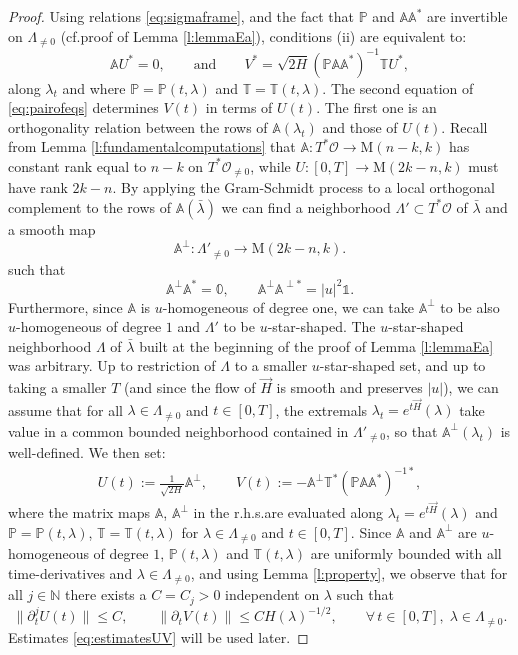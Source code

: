 \documentclass[10pt,a4paper]{amsart}
\newcommand{\A}{\mathbb{A}}
\newcommand{\N}{\mathbb{N}} %
\renewcommand{\P}{\mathbb{P}}
\begin{document}
\begin{proof}
Using relations \eqref{eq:sigmaframe}, and the fact that $\P$ and $\A\A^*$ are invertible on $\Lambda_{\neq 0}$ (cf.\@ proof of Lemma \ref{l:lemmaEa}), conditions (ii) are equivalent to:
\begin{equation}\label{eq:pairofeqs}
\A U^* = 0, \qquad \text{and}\qquad V^* = \sqrt{2H}(\P\A\A^*)^{-1}\mathbb{T}U^*,
\end{equation}
along $\lambda_t$ and where $\P = \P(t,\lambda)$ and $\mathbb{T} = \mathbb{T}(t,\lambda)$.
The second equation of \eqref{eq:pairofeqs} determines $V(t)$ in terms of $U(t)$. The first one is an orthogonality relation between the rows of $\A(\lambda_t)$ and those of $U(t)$. Recall from Lemma \ref{l:fundamentalcomputations} that $\A : T^*\mathcal{O} \to \mathrm{M}(n-k,k)$ has constant rank equal to $n-k$ on $T^*\mathcal{O}_{\neq 0}$, while $U: [0,T]\to \mathrm{M}(2k-n,k)$ must have rank $2k-n$. By applying the Gram-Schmidt process to a local orthogonal complement to the rows of $\A(\bar{\lambda})$ we can find a neighborhood $\Lambda' \subset T^*\mathcal{O}$ of $\bar{\lambda}$ and a smooth map
\begin{equation}
\A^\perp : \Lambda'_{\neq 0} \to \mathrm{M}(2k-n,k).
\end{equation}
such that 
\begin{equation}\label{eq:propertiesA}
\A^\perp \A^* = \mathbb{0}, \qquad \A^\perp \A^{\perp *} = |u|^2 \mathbb{1}.
\end{equation}
Furthermore, since $\A$ is $u$-homogeneous of degree one, we can take $\A^\perp$ to be also $u$-homogeneous of degree $1$ and $\Lambda'$ to be $u$-star-shaped. The $u$-star-shaped neighborhood $\Lambda$ of $\bar{\lambda}$ built at the beginning of the proof of Lemma \ref{l:lemmaEa} was arbitrary. Up to restriction of $\Lambda$ to a smaller $u$-star-shaped set, and up to taking a smaller $T$ (and since the flow of $\vec{H}$ is smooth and preserves $|u|$), we can assume that for all $\lambda \in \Lambda_{\neq 0}$ and $t\in [0,T]$, the extremals $\lambda_t = e^{t\vec{H}}(\lambda)$ take value in a common bounded neighborhood contained in $\Lambda'_{\neq 0}$, so that $\A^\perp(\lambda_t)$ is well-defined. We then set:
\begin{align}\label{eq:UandV}
U(t) := \frac{1}{\sqrt{2H}}\A^{\perp}, \qquad V(t)  :=-\A^{\perp}\mathbb{T}^*(\P\A\A^*)^{-1*},
\end{align}
where the matrix maps $\A$, $\A^\perp$ in the r.h.s.\@ are evaluated along $\lambda_t = e^{t\vec{H}}(\lambda)$ and $\P = \P(t,\lambda)$, $\mathbb{T}=\mathbb{T}(t,\lambda)$ for $\lambda \in \Lambda_{\neq 0}$ and $t\in [0,T]$. Since $\A$ and $\A^\perp$ are $u$-homogeneous of degree $1$, $\P(t,\lambda)$ and $\mathbb{T}(t,\lambda)$ are uniformly bounded with all time-derivatives and $\lambda \in \Lambda_{\neq 0}$, and using Lemma \ref{l:property}, we observe that for all $j\in \N$ there exists a $C=C_j>0$ independent on $\lambda$ such that
\begin{equation}\label{eq:estimatesUV}
\|\partial_t^j U(t)\| \leq C, \qquad \|\partial_t V(t)\| \leq C H(\lambda)^{-1/2}, \qquad \forall\, t\in [0,T],\; \lambda \in \Lambda_{\neq 0}.
\end{equation}
Estimates \eqref{eq:estimatesUV} will be used later.


\end{proof}
\end{document}
